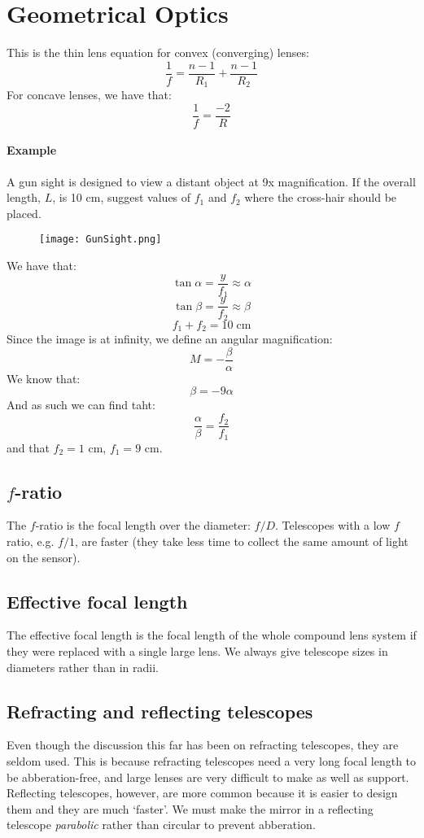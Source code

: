 \section{Geometrical Optics}

This is the thin lens equation for convex (converging) lenses:
$$
	\frac{1}{f} = \frac{n-1}{R_1} + \frac{n-1}{R_2}
$$
For concave lenses, we have that:
$$
	\frac{1}{f} = \frac{-2}{R}
$$
\paragraph{Example}A gun sight is designed to view a distant object at 9x
magnification. If the overall length, $L$, is 10 cm, suggest values of $f_1$ and
$f_2$ where the cross-hair should be placed.
\begin{figure}[h!]
	\centering
	\texttt{[image: GunSight.png]}
\end{figure}

We have that:
$$
	\tan \alpha = \frac{y}{f_1} \approx \alpha
$$
$$
	\tan \beta = \frac{y}{f_2} \approx \beta
$$
$$
	f_1 + f_2 = 10\; \mathrm{cm}
$$
Since the image is at infinity, we define an angular magnification:
$$
	M = -\frac{\beta}{\alpha}
$$
We know that:
$$
	\beta = -9\alpha
$$
And as such we can find taht:
$$
	\frac{\alpha}{\beta} = \frac{f_2}{f_1}
$$
and that $f_2 = 1$ cm, $f_1 = 9$ cm.

\subsection{$f$-ratio}
The $f$-ratio is the focal length over the diameter: $f/D$. Telescopes with a
low $f$ ratio, e.g. $f/1$, are faster (they take less time to collect the same
amount of light on the sensor).

\subsection{Effective focal length}
The effective focal length is the focal length of the whole compound lens system
if they were replaced with a single large lens. We always give telescope sizes
in diameters rather than in radii.

\subsection{Refracting and reflecting telescopes}
Even though the discussion this far has been on refracting telescopes, they are
seldom used. This is because refracting telescopes need a very long focal length
to be abberation-free, and large lenses are very difficult to make as well as
support. Reflecting telescopes, however, are more common because it is easier to
design them and they are much `faster'. We must make the mirror in a reflecting
telescope \emph{parabolic} rather than circular to prevent abberation.

